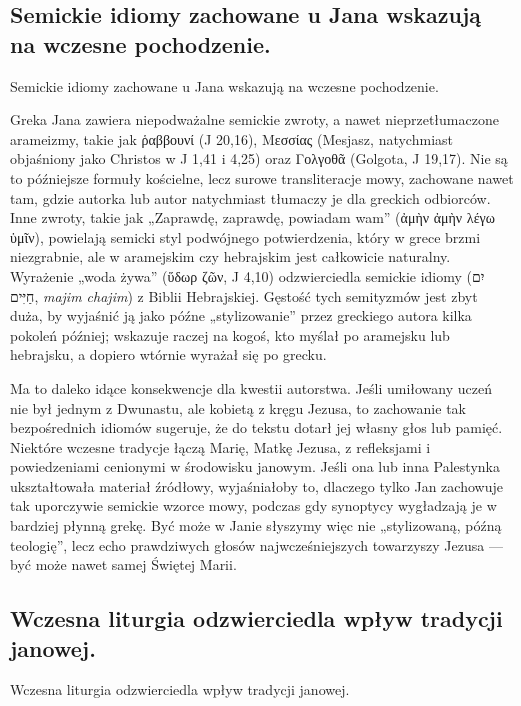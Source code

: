 \subsection{Semickie idiomy zachowane u Jana wskazują na wczesne pochodzenie.}\label{subsec:semitic-idioms-preserved-in-john-indicate-early-origin.}

Semickie idiomy zachowane u Jana wskazują na wczesne pochodzenie.

Greka Jana zawiera niepodważalne semickie zwroty, a nawet nieprzetłumaczone arameizmy, takie jak ῥαββουνί (J 20,16), Μεσσίας (Mesjasz, natychmiast objaśniony jako Christos w J 1,41 i 4,25) oraz Γολγοθᾶ (Golgota, J 19,17).
Nie są to późniejsze formuły kościelne, lecz surowe transliteracje mowy, zachowane nawet tam, gdzie autorka lub autor natychmiast tłumaczy je dla greckich odbiorców.
Inne zwroty, takie jak „Zaprawdę, zaprawdę, powiadam wam” (ἀμὴν ἀμὴν λέγω ὑμῖν), powielają semicki styl podwójnego potwierdzenia, który w grece brzmi niezgrabnie, ale w aramejskim czy hebrajskim jest całkowicie naturalny.
Wyrażenie „woda żywa” (ὕδωρ ζῶν, J 4,10) odzwierciedla semickie idiomy (\texthebrew{יִם חַיִּים}, \textit{majim chajim}) z Biblii Hebrajskiej.
Gęstość tych semityzmów jest zbyt duża, by wyjaśnić ją jako późne „stylizowanie” przez greckiego autora kilka pokoleń później;
wskazuje raczej na kogoś, kto myślał po aramejsku lub hebrajsku, a dopiero wtórnie wyrażał się po grecku.

Ma to daleko idące konsekwencje dla kwestii autorstwa.
Jeśli umiłowany uczeń nie był jednym z Dwunastu, ale kobietą z kręgu Jezusa, to zachowanie tak bezpośrednich idiomów sugeruje, że do tekstu dotarł jej własny głos lub pamięć.
Niektóre wczesne tradycje łączą Marię, Matkę Jezusa, z refleksjami i powiedzeniami cenionymi w środowisku janowym.
Jeśli ona lub inna Palestynka ukształtowała materiał źródłowy, wyjaśniałoby to, dlaczego tylko Jan zachowuje tak uporczywie semickie wzorce mowy, podczas gdy synoptycy wygładzają je w bardziej płynną grekę.
Być może w Janie słyszymy więc nie „stylizowaną, późną teologię”, lecz echo prawdziwych głosów najwcześniejszych towarzyszy Jezusa --- być może nawet samej Świętej Marii.

\subsection{Wczesna liturgia odzwierciedla wpływ tradycji janowej.}\label{subsec:early-liturgy-reflects-johannine-influence.}

Wczesna liturgia odzwierciedla wpływ tradycji janowej.

